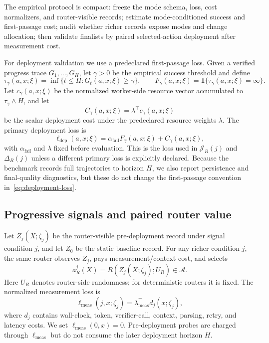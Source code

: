 \documentclass{article}
\newcommand{\cA}{\mathcal{A}}
\newcommand{\J}{\mathcal{J}}
\newcommand{\one}{\mathbf{1}}
\begin{document}
The empirical protocol is compact: freeze the mode schema, loss, cost normalizers, and
router-visible records; estimate mode-conditioned success and first-passage cost; audit
whether richer records expose modes and change allocation; then validate finalists by paired
selected-action deployment after measurement cost.

For deployment validation we use a predeclared first-passage loss.  Given a verified
progress trace \(G_1,\ldots,G_H\), let \(\gamma>0\) be the empirical success threshold and define
\[
    \tau_\gamma(a,x;\xi)
    =
    \inf\{t\le H:G_t(a,x;\xi)\ge\gamma\},
    \qquad
    F_\gamma(a,x;\xi)
    =
    \one\{\tau_\gamma(a,x;\xi)=\infty\}.
\]
Let \(c_\gamma(a,x;\xi)\) be the normalized worker-side resource vector accumulated to
\(\tau_\gamma\wedge H\), and let
\[
    C_\gamma(a,x;\xi)
    =
    \lambda^\top c_\gamma(a,x;\xi)
\]
be the scalar deployment cost under the predeclared resource weights \(\lambda\).
The primary deployment loss is
\begin{equation}
\ell_{\mathrm{dep}}(a,x;\xi)
=
\alpha_{\mathrm{fail}}F_\gamma(a,x;\xi)
+
C_\gamma(a,x;\xi),
\label{eq:deployment-loss}
\end{equation}
with \(\alpha_{\mathrm{fail}}\) and \(\lambda\) fixed before evaluation.
This is the loss used in \(\J_R(j)\) and \(\Delta_R(j)\) unless a different primary loss is
explicitly declared.  Because the benchmark records full trajectories to horizon \(H\), we
also report persistence and final-quality diagnostics, but these do not change the
first-passage convention in~\eqref{eq:deployment-loss}.

\subsection{Progressive signals and paired router value}
\label{subsec:paired}

Let \(Z_j(X;\zeta_j)\) be the router-visible pre-deployment record under signal condition
\(j\), and let \(Z_0\) be the static baseline record.  For any richer condition \(j\), the same
router observes \(Z_j\), pays measurement/context cost, and selects
\[
    a_R^j(X)=R(Z_j(X;\zeta_j);U_R)\in\cA .
\]
Here \(U_R\) denotes router-side randomness; for deterministic routers it is fixed.
The normalized measurement loss is
\[
    \ell_{\mathrm{meas}}(j,x;\zeta_j)
    =
    \lambda_{\mathrm{meas}}^\top d_j(x;\zeta_j),
\]
where \(d_j\) contains wall-clock, token, verifier-call, context, parsing, retry, and latency
costs.  We set \(\ell_{\mathrm{meas}}(0,x)=0\).  Pre-deployment probes are charged through
\(\ell_{\mathrm{meas}}\) but do not consume the later deployment horizon \(H\).
\end{document}
